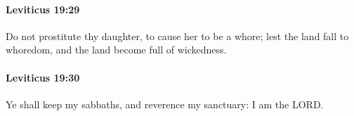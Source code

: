 		\paragraph{Leviticus 19:29} %
			\label{LEVITICUS-19-29}

			Do not prostitute thy daughter, to cause her to be a whore; lest the land fall to whoredom, and the land become full of wickedness.


		\paragraph{Leviticus 19:30} %
			\label{LEVITICUS-19-30}

			Ye shall keep my sabbaths, and reverence my sanctuary: I am the LORD.


